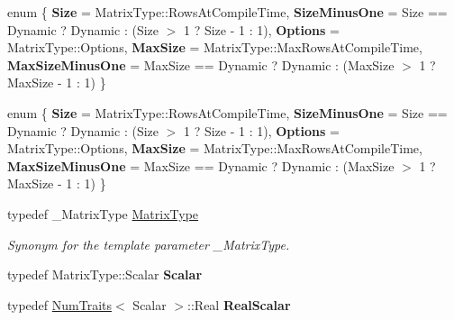 \begin{DoxyCompactItemize}
\item 
\mbox{\label{group___eigenvalues___module_a10ca5c556d8f827d5feeebb4fb5e2141}} 
enum \{ \newline
{\bfseries Size} = Matrix\+Type\+:\+:Rows\+At\+Compile\+Time, 
{\bfseries Size\+Minus\+One} = Size == Dynamic ? Dynamic \+: (Size $>$ 1 ? Size -\/ 1 \+: 1), 
{\bfseries Options} = Matrix\+Type\+:\+:Options, 
{\bfseries Max\+Size} = Matrix\+Type\+:\+:Max\+Rows\+At\+Compile\+Time, 
\newline
{\bfseries Max\+Size\+Minus\+One} = Max\+Size == Dynamic ? Dynamic \+: (Max\+Size $>$ 1 ? Max\+Size -\/ 1 \+: 1)
 \}
\item 
\mbox{\label{group___eigenvalues___module_a4e7b4996ed734e675c49cea9ed571e17}} 
enum \{ \newline
{\bfseries Size} = Matrix\+Type\+:\+:Rows\+At\+Compile\+Time, 
{\bfseries Size\+Minus\+One} = Size == Dynamic ? Dynamic \+: (Size $>$ 1 ? Size -\/ 1 \+: 1), 
{\bfseries Options} = Matrix\+Type\+:\+:Options, 
{\bfseries Max\+Size} = Matrix\+Type\+:\+:Max\+Rows\+At\+Compile\+Time, 
\newline
{\bfseries Max\+Size\+Minus\+One} = Max\+Size == Dynamic ? Dynamic \+: (Max\+Size $>$ 1 ? Max\+Size -\/ 1 \+: 1)
 \}
\item 
\mbox{\label{group___eigenvalues___module_add0f4b2216d0ea8ee0f7d8525deaf0a9}} 
typedef \+\_\+\+Matrix\+Type \hyperlink{group___eigenvalues___module_add0f4b2216d0ea8ee0f7d8525deaf0a9}{Matrix\+Type}
\begin{DoxyCompactList}\small\item\em Synonym for the template parameter {\ttfamily \+\_\+\+Matrix\+Type}. \end{DoxyCompactList}\item 
\mbox{\label{group___eigenvalues___module_af3f9d8d46f2a1663013e207ff568b5f9}} 
typedef Matrix\+Type\+::\+Scalar {\bfseries Scalar}
\item 
\mbox{\label{group___eigenvalues___module_a9d33e4c11dad35a8b147cbe048974700}} 
typedef \hyperlink{group___core___module_struct_eigen_1_1_num_traits}{Num\+Traits}$<$ Scalar $>$\+::Real {\bfseries Real\+Scalar}

\end{DoxyCompactItemize}
